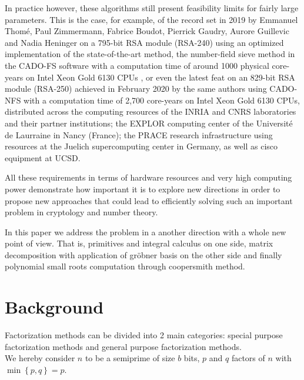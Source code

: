 \documentclass[sigconf,balance=false]{acmart}
\begin{document}
In practice however, these algorithms still present feasibility limits for fairly large parameters. This is the case, for example, of the record set in 2019 by Emmanuel Thomé, Paul Zimmermann, Fabrice Boudot, Pierrick Gaudry, Aurore Guillevic and Nadia Heninger on a 795-bit RSA module (RSA-240) using an optimized implementation of the state-of-the-art method, the number-field sieve method in the CADO-FS software \cite{kdo} with a computation time of around 1000 physical core-years on Intel Xeon Gold 6130 CPUs \cite{kdo1}, or even the latest feat on an 829-bit RSA module (RSA-250) achieved in February 2020 by the same authors using CADO-NFS with a computation time of 2,700 core-years on 
Intel Xeon Gold 6130 CPUs, distributed across the computing resources of the INRIA and CNRS laboratories and their partner institutions; the EXPLOR computing center of the 
Université de Laurraine in Nancy (France); the PRACE research infrastructure using resources at the Juelich supercomputing center in Germany, as well as cisco equipment at UCSD. 

All these requirements in terms of hardware resources and very high computing power demonstrate how important it is to explore new directions in order to propose new approaches that could lead to efficiently solving such an important problem in cryptology and number theory.

In this paper we address the problem in a another direction with a whole new point of view. That is, primitives and integral calculus on one side,  matrix decomposition with application of gröbner basis on the other side and finally polynomial small roots computation through coopersmith method.



\section{Background}
\label{sec:background}



Factorization methods can be divided into 2 main categories: special purpose factorization methods and general purpose factorization methods.\\
We hereby consider $n$ to be a semiprime of size $b$ bits, $p$ and $q$ factors of $n$ with $\min \left\lbrace  p, q \right\rbrace =p$.
\end{document}
